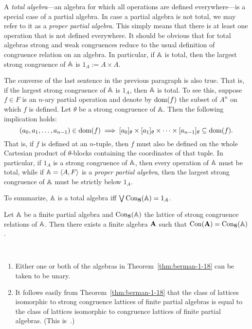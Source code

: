 A \emph{total algebra}---an algebra for which all operations are defined everywhere---is
a special case of a partial algebra. In case a partial algebra is not total,
we may refer to it as a \emph{proper partial algebra}.
This simply means that there is at least one operation that is not defined everywhere.
It should be obvious that for total algebras strong and weak congruences reduce to the usual
definition of congruence relation on an algebra.
In particular, if $\mathbb{A}$ is total, then the largest strong congruence of $\mathbb{A}$ is $1_A := A\times A$.

The converse of the last sentence in the previous paragraph is also true.
That is, if the largest strong congruence of $\mathbb{A}$ is $1_A$, then $\mathbb{A}$ is total.
To see this, suppose $f \in F$ is an $n$-ary partial operation and 
denote by $\operatorname{dom}(f)$ the subset of $A^n$ on which $f$ is defined.
Let $\theta$ be a strong congruence of $\mathbb{A}$.
Then the following implication holds:
\[ (a_0, a_1, \dots, a_{n-1})\in \operatorname{dom}(f) \;  \Longrightarrow \;
   [a_0]_\theta \times [a_1]_\theta \times \cdots \times [a_{n-1}]_\theta \subseteq \operatorname{dom}(f).
   \]
That is, if $f$ is defined at an $n$-tuple,
then $f$ must also be defined on the whole Cartesian product of $\theta$-blocks containing the
coordinates of that tuple.
In particular, if $1_A$ is a strong congruence of $\mathbb{A}$, then every operation of
$\mathbb{A}$ must be total, while if $\mathbb{A} = \langle A, F\rangle$ is a \emph{proper partial algebra},
then the largest strong congruence of $\mathbb{A}$
must be strictly below $1_A$.

To summarize, $\mathbb{A}$ is a total algebra iff $\bigvee \operatorname{Con_{\mathbf{S}}}(\mathbb{A}) = 1_A$.

\begin{theorem}
  \label{thm:berman-1-18}
  Let $\mathbb{A}$ be a finite partial algebra and $\operatorname{Con_{\mathbf{S}}}(\mathbb{A})$ the lattice of strong
  congruence relations of $\mathbb{A}$.  Then there exists a finite algebra $\mathbf{A}$
  such that $\operatorname{Con}(\mathbf{A}) = \operatorname{Con_{\mathbf{S}}}(\mathbb{A})$.
\end{theorem}
\begin{remarks}\
  \begin{enumerate}
  \item  Either one or both of the algebras in Theorem~\ref{thm:berman-1-18} can be
    taken to be unary.
  \item It follows easily from Theorem~\ref{thm:berman-1-18} that the class
    of lattices isomorphic to strong congruence lattices of finite
    partial algebras is equal to the class of lattices isomorphic to
    congruence lattices of finite partial algebras.
    (This is~\cite[Thm~1.19]{MR2619731}.)
  \end{enumerate}
\end{remarks}


